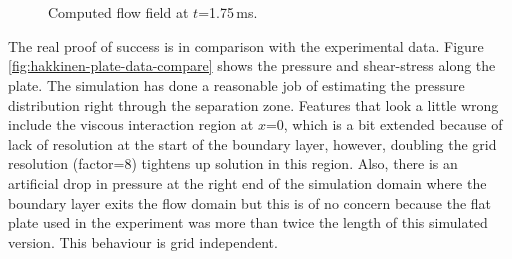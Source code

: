 \begin{figure}[htbp]
 \centering
 \\
 \\
 \caption{Computed flow field at $t$=1.75\,ms.}
 \label{fig:hakkinen-field-data}
\end{figure}

\medskip
The real proof of success is in comparison with the experimental data.
Figure\,\ref{fig:hakkinen-plate-data-compare} shows the pressure and shear-stress along the plate.
The simulation has done a reasonable job of estimating the pressure distribution right 
through the separation zone.
Features that look a little wrong include the viscous interaction region at $x$=0,
which is a bit extended because of lack of resolution at the start of the boundary layer,
however, doubling the grid resolution (factor=8) tightens up solution in this region.
Also, there is an artificial drop in pressure at the right end of the simulation domain
where the boundary layer exits the flow domain but this is of no concern because  
the flat plate used in the experiment was more than twice the length of this simulated version.
This behaviour is grid independent.

